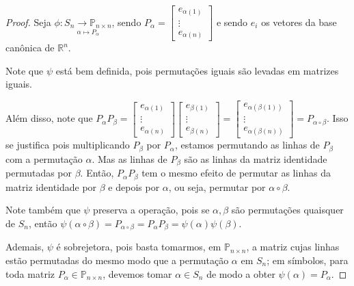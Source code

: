 	\begin{proof}
		Seja $\phi: \underset{\alpha\mapsto P_{\alpha}}{S_n\to\mathbb{P}_{n\times n}}$, sendo $\displaystyle{P_{\alpha} = \begin{bmatrix}
			e_{\alpha(1)} \\
			\vdots \\
			e_{\alpha(n)}
			\end{bmatrix}}$ e sendo $e_i$ os vetores da base canônica de $\mathbb{R}^n$.
			
		\par\vspace{0.3cm} Note que $\psi$ está bem definida, pois permutações iguais são levadas 
		em matrizes iguais.
		
		\par\vspace{0.3cm}	Além disso, note que $\displaystyle{ P_{\alpha}P_{\beta} = \begin{bmatrix}
			e_{\alpha(1)} \\
			\vdots \\
			e_{\alpha(n)}
			\end{bmatrix}\begin{bmatrix}
			e_{\beta(1)} \\
			\vdots \\
			e_{\beta(n)}
			\end{bmatrix} = \begin{bmatrix}
			e_{\alpha(\beta(1))} \\
			\vdots \\
			e_{\alpha(\beta(n))}
			\end{bmatrix} = P_{\alpha\circ\beta} }$. Isso se justifica pois multiplicando $P_{\beta}$ por
			$P_{\alpha}$, estamos permutando as linhas de $P_{\beta}$ com a permutação $\alpha$. 
			Mas as linhas de $P_{\beta}$ são as linhas da matriz identidade permutadas por $\beta$. 
			Então, $P_{\alpha}P_{\beta}$ tem o mesmo efeito de permutar as linhas da matriz identidade 
			por $\beta$ e depois por $\alpha$, ou seja, permutar por $\alpha\circ\beta$. 
			
		\par\vspace{0.3cm} Note também que $\psi$ preserva a operação, pois se $\alpha, \beta$ são 
		permutações quaisquer de $S_n$, então $\psi(\alpha\circ\beta) = P_{\alpha\circ\beta} 
		= P_{\alpha}P_{\beta} = \psi(\alpha)\psi(\beta)$.
		
		\par\vspace{0.3cm} Ademais, $\psi$ é sobrejetora, pois basta tomarmos, em $\mathbb{P}_{n\times n}$, 
		a matriz cujas linhas estão permutadas do mesmo modo que a permutação $\alpha$ em $S_n$; em símbolos, 
		para toda matriz $P_{\alpha}\in\mathbb{P}_{n\times n}$, devemos tomar $\alpha\in S_n$ de modo a obter
		$\psi(\alpha) = P_{\alpha}$. 
		

\end{proof}
